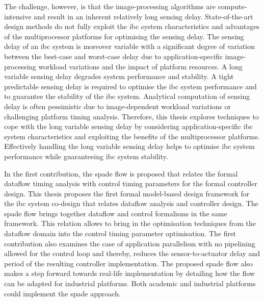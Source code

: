 The challenge, however, is that the image-processing algorithms are compute-intensive and result in an inherent relatively long sensing delay. State-of-the-art design methods do not fully exploit the \gls{ibc} system characteristics and advantages of the multiprocessor platforms for optimising the sensing delay. 
The sensing delay of an \gls{ibc} system is moreover variable with a significant degree of variation between the best-case and worst-case delay due to application-specific image-processing workload variations and the impact of platform resources. A long variable sensing delay degrades system performance and stability. A tight predictable sensing delay is required to optimise the \gls{ibc} system performance and to guarantee the stability of the \gls{ibc} system. Analytical computation of sensing delay is often pessimistic due to image-dependent workload variations or challenging platform timing analysis. Therefore, this thesis explores techniques to cope with the long variable sensing delay by considering application-specific \gls{ibc} system characteristics and exploiting the benefits of the multiprocessor platforms. Effectively handling the long variable sensing delay helps to optimise \gls{ibc} system performance while guaranteeing \gls{ibc} system stability.

In the first contribution, the \gls{spade} flow is proposed that relates the formal dataflow timing analysis with control timing parameters for the formal controller design.
This thesis proposes the first formal model-based design framework for the \gls{ibc} system co-design that relates dataflow analysis and controller design. 
The \gls{spade} flow brings together dataflow and control formalisms in the same framework.
This relation allows to bring in the optimisation techniques from the dataflow domain into the control timing parameter optimisation. 
The first contribution also examines the case of application parallelism with no pipelining allowed for the control loop and thereby, reduces the sensor-to-actuator delay and period of the resulting controller implementation.
The proposed \gls{spade} flow also makes a step forward towards real-life implementation by detailing how the flow can be adapted for industrial platforms. Both academic and industrial platforms could implement the \gls{spade} approach.

